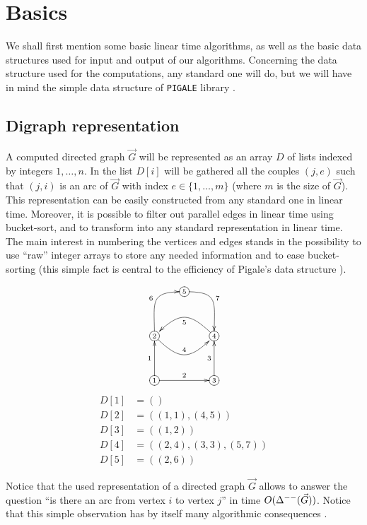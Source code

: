 \documentclass[a4paper]{amsart}
\theoremstyle{definition}
\theoremstyle{remark}
\DeclareMathOperator\md{\Delta^{\rm --}}
\def\vG{\vec{G}}
\begin{document}
\section{Basics}
We shall first mention some basic linear time
algorithms, as well as the basic data structures used for input and
output of our algorithms. Concerning the data structure used for the
computations, any standard one will do, but we will have in
mind the simple data structure of {\tt PIGALE} library
\cite{Taxi_pigale}. 

\subsection{Digraph representation}

A computed directed graph $\vG$ will be represented as an array $D$ of lists
indexed by integers $1,\dotsc,n$. In the list $D[i]$ will be gathered
all the couples $(j,e)$  such that $(j,i)$ is an arc of $\vG$ 
with index $e\in\{1,\dotsc,m\}$ (where $m$ is the size of $\vG$). 
This representation can be easily constructed from any standard one
in linear time. Moreover, it is possible to filter out parallel edges in linear
time using bucket-sort, and to transform into any standard representation in
linear time. The main interest in numbering the vertices and edges stands in the 
possibility to use ``raw'' integer arrays to store any needed information
and to ease bucket-sorting (this simple fact is central to the efficiency of
Pigale's data structure \cite{Taxi_pigale}).


$$
\begin{xy}<15pt,0cm>:
(0,0)*+{\scriptstyle 1}*[o]{\cir{}}="va",
(0,3)*+{\scriptstyle 2}*[o]{\cir{}}="vb",
(4,0)*+{\scriptstyle 3}*[o]{\cir{}}="vc",
(4,3)*+{\scriptstyle 4}*[o]{\cir{}}="vd",
(2,6)*+{\scriptstyle 5}*[o]{\cir{}}="ve"
\ar@{->}^{1} "va";"vb"
\ar@{->}^{2} "va";"vc"
\ar@{->}^{3} "vc";"vd"
\ar@{->}^{4}@(dr,dl) "vb";"vd"
\ar@{->}^{5}@(ul,ur) "vd";"vb"
\ar@{->}^{6}@(u,l) "vb";"ve"
\ar@{->}^{7}@(r,u) "ve";"vd"
\end{xy}
$$
$$
\begin{aligned}
D[1]&=()\\
D[2]&=((1,1),(4,5))\\
D[3]&=((1,2))\\
D[4]&=((2,4),(3,3),(5,7))\\
D[5]&=((2,6))
\end{aligned}
$$

Notice that the used representation of a directed graph $\vG$ allows to
answer the question ``is there an arc from vertex $i$ to vertex $j$''
in time $O(\md(\vG))$. Notice that this simple observation has by
itself many algorithmic consequences \cite{chrobak}.
\end{document}

